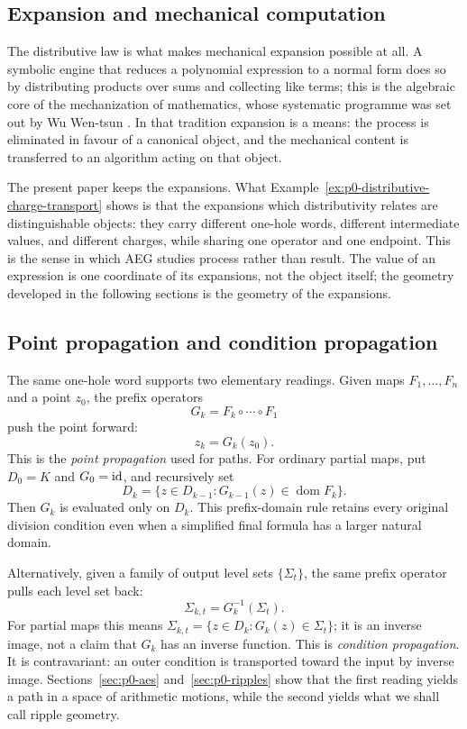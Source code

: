 \subsection{Expansion and mechanical computation}

The distributive law is what makes mechanical expansion possible at all.  A
symbolic engine that reduces a polynomial expression to a normal form does so
by distributing products over sums and collecting like terms; this is the
algebraic core of the mechanization of mathematics, whose systematic programme
was set out by Wu Wen-tsun \cite{Wu2000MathematicsMechanization}.  In that
tradition expansion is a means: the process is eliminated in favour of a
canonical object, and the mechanical content is transferred to an algorithm
acting on that object.

The present paper keeps the expansions.  What
Example~\ref{ex:p0-distributive-charge-transport} shows is that the expansions
which distributivity relates are distinguishable objects: they carry different
one-hole words, different intermediate values, and different charges, while
sharing one operator and one endpoint.  This is the sense in which AEG studies
process rather than result.  The value of an expression is one coordinate of
its expansions, not the object itself; the geometry developed in the following
sections is the geometry of the expansions.

\subsection{Point propagation and condition propagation}

The same one-hole word supports two elementary readings.  Given maps
$F_1,\ldots,F_n$ and a point $z_0$, the prefix operators
\[
  G_k=F_k\circ\cdots\circ F_1
\]
push the point forward:
\[
  z_k=G_k(z_0).
\]
This is the \emph{point propagation} used for paths.
For ordinary partial maps, put $D_0=K$ and $G_0=\operatorname{id}$, and recursively set
\[
  D_k=\{z\in D_{k-1}:G_{k-1}(z)\in\operatorname{dom}F_k\}.
\]
Then $G_k$ is evaluated only on $D_k$.  This prefix-domain rule retains
every original division condition even when a simplified final formula has
a larger natural domain.

Alternatively, given a family of output level sets $\{\Sigma_t\}$, the same
prefix operator pulls each level set back:
\[
  \Sigma_{k,t}=G_k^{-1}(\Sigma_t).
\]
For partial maps this means
$\Sigma_{k,t}=\{z\in D_k:G_k(z)\in\Sigma_t\}$; it is an inverse
image, not a claim that $G_k$ has an inverse function.
This is \emph{condition propagation}.  It is contravariant: an outer condition
is transported toward the input by inverse image.  Sections~\ref{sec:p0-aes}
and~\ref{sec:p0-ripples} show that the first reading yields a path in a space of
arithmetic motions, while the second yields what we shall call ripple geometry.
